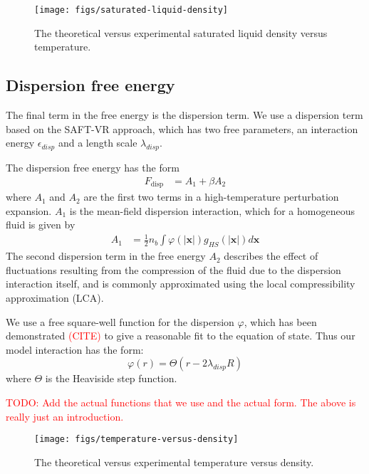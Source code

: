 \documentclass[letterpaper,twocolumn,amsmath,amssymb,prb]{revtex4-1}
\newcommand{\xx}{\textbf{x}}
\begin{document}
\begin{figure}
\begin{center}
\texttt{[image: figs/saturated-liquid-density]}
\end{center}
\caption{The theoretical versus experimental saturated liquid density
  versus temperature.  }
\label{fig:saturated-liquid-density}
\end{figure}

\subsection{Dispersion free energy}
The final term in the free energy is the dispersion term.  We use a
dispersion term based on the SAFT-VR
approach\cite{gil-villegas-1997-SAFT-VR}, which has two free
parameters, an interaction energy $\epsilon_\textit{disp}$ and a
length scale $\lambda_\textit{disp}$.

The dispersion free energy has the form~\cite{gil-villegas-1997-SAFT-VR}
\begin{align}
  F_\text{disp} &= A_1 + \beta A_2
\end{align}
where $A_1$ and $A_2$ are the first two terms in a high-temperature
perturbation expansion.  $A_1$ is the mean-field dispersion
interaction, which for a homogeneous fluid is given by
\begin{align}
  A_1 &= \frac12 n_b \int \varphi(\left|\xx\right|)
  g_{HS}(\left|\xx\right|) d\xx
\end{align}
The second dispersion term in the free energy $A_2$ describes the
effect of fluctuations resulting from the compression of the fluid due
to the dispersion interaction itself, and is commonly approximated
using the local compressibility approximation (LCA).

We use a free square-well function for the dispersion $\varphi$, which
has been demonstrated \textcolor{red}{(CITE)} to give a reasonable fit
to the equation of state.  Thus our model interaction has the form:
\begin{equation}
  \varphi(r) = \Theta(r-2 \lambda_\textit{disp} R)
\end{equation}
where $\Theta$ is the Heaviside step function.

\textcolor{red}{TODO:  Add the actual functions that we use and the
  actual form.  The above is really just an introduction.}


\begin{figure}
\begin{center}
\texttt{[image: figs/temperature-versus-density]}
\end{center}
\caption{The theoretical versus experimental temperature versus density. }
\label{fig:saturated-liquid-density}
\end{figure}
\end{document}

